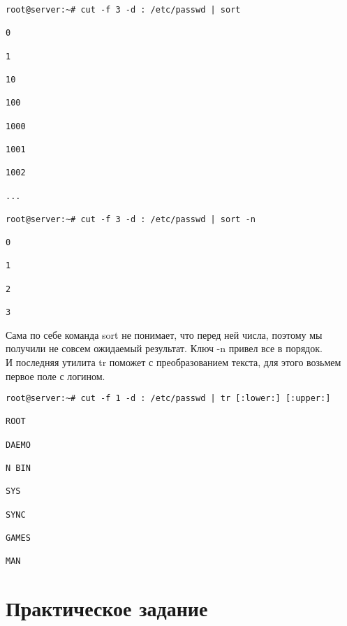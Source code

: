 \documentclass[14pt, a4paper]{article}
\begin{document}
\begin{lstlisting}
root@server:~# cut -f 3 -d : /etc/passwd | sort

0

1

10

100

1000

1001

1002

...

root@server:~# cut -f 3 -d : /etc/passwd | sort -n

0

1

2

3

\end{lstlisting}
\vspace{0.2cm}

Сама по себе команда sort не понимает, что перед ней числа, поэтому мы получили не совсем
ожидаемый результат. Ключ -n привел все в порядок.\\

И последняя утилита tr поможет с преобразованием текста, для этого возьмем первое поле с логином.

\vspace{0.3cm}
\begin{lstlisting}
root@server:~# cut -f 1 -d : /etc/passwd | tr [:lower:] [:upper:]

ROOT

DAEMO

N BIN

SYS

SYNC

GAMES

MAN

\end{lstlisting}



\section*{Практическое задание} 
\end{document}
